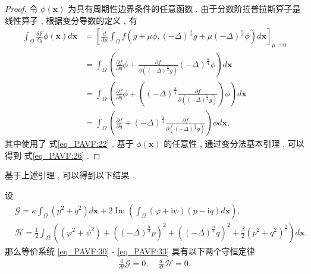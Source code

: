 \begin{proof}
	令 $\phi(\boldsymbol{x})$ 为具有周期性边界条件的任意函数 . 由于分数阶拉普拉斯算子是线性算子 , 根据变分导数的定义 , 有
\begin{equation}
\begin{aligned}
\int_{\Omega} \frac{\delta F}{\delta g} \phi(\boldsymbol{x}) d \boldsymbol{x} &=\left[\frac{d}{d \mu} \int_{\Omega} f\left(g+\mu \phi , (-\Delta)^{\frac{\alpha}{4}} g+\mu(-\Delta)^{\frac{\alpha}{4}} \phi\right) d \boldsymbol{x}\right]_{\mu=0} \\
&=\int_{\Omega}\left(\frac{\partial f}{\partial g} \phi+\frac{\partial f}{\partial\left((-\Delta)^{\frac{\alpha}{4}} g\right)}(-\Delta)^{\frac{\alpha}{4}} \phi\right) d \boldsymbol{x}\\
&=\int_{\Omega}\left(\frac{\partial f}{\partial g} \phi+\left((-\Delta)^{\frac{\alpha}{4}} \frac{\partial f}{\partial\left((-\Delta)^{\frac{\alpha}{4}} g\right)}\right) \phi\right) d \boldsymbol{x} \\
&=\int_{\Omega}\left(\frac{\partial f}{\partial g}+(-\Delta)^{\frac{\alpha}{4}} \frac{\partial f}{\partial\left((-\Delta)^{\frac{\alpha}{4}} g\right)}\right) \phi d \boldsymbol{x} , 
\end{aligned}
\label{eq_27}\end{equation}
其中使用了 式\eqref{eq_PAVF:22} . 基于 $\phi(\boldsymbol{x})$ 的任意性 , 通过变分法基本引理 , 可以得到 式\eqref{eq_PAVF:26} . 

\end{proof}

基于上述引理 , 可以得到以下结果 . 

\begin{theorem}	\label{thm_PAVF:2_1}
设
\begin{align}
&\mathcal{G}=\kappa\int_{\Omega}(p^2+q^2) d \boldsymbol{x}+2\operatorname{Im}(\int_{\Omega}(\varphi+\mathrm{i}\psi)(p-\mathrm{i}q)d \boldsymbol{x}) , \label{eq_PAVF:34} \\
&\mathcal{H}=\frac{1}{2}\int_{\Omega}\left((\varphi^2+\psi^2)+\left((-\Delta)^{\frac{\alpha}{4}} p\right)^{2}+\left((-\Delta)^{\frac{\alpha}{4}} q\right)^{2}+\frac{\beta}{2}(p^2+q^2)^{2}\right) d \boldsymbol{x} . \label{eq_PAVF:35}
\end{align}
那么等价系统 \eqref{eq_PAVF:30} - \eqref{eq_PAVF:33} 具有以下两个守恒定律
\begin{align}
\frac{d}{d t} \mathcal{G}=0 , \quad \frac{d}{d t} \mathcal{H}=0 . 
\end{align}
\end{theorem}

